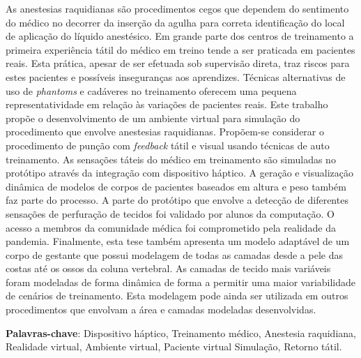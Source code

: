 \begin{resumo}


As anestesias raquidianas são procedimentos cegos que dependem do sentimento do médico no decorrer da inserção da agulha para correta identificação do local de aplicação do líquido anestésico. Em grande parte dos centros de treinamento a primeira experiência tátil do médico em treino tende a ser praticada em pacientes reais. Esta prática, apesar de ser efetuada sob supervisão direta, traz riscos para estes pacientes e possíveis inseguranças aos aprendizes. Técnicas alternativas de uso de \textit{phantoms} e cadáveres no treinamento oferecem uma pequena representatividade em relação às variações de pacientes reais. 
Este trabalho propõe o desenvolvimento de um ambiente virtual para simulação do procedimento que envolve anestesias raquidianas. Propõem-se considerar o procedimento de punção com \textit{feedback} tátil e visual usando técnicas de auto treinamento. As sensações táteis do médico em treinamento são simuladas no protótipo através da integração com dispositivo háptico. A geração e visualização dinâmica de modelos de corpos de pacientes baseados em altura e peso também faz parte do processo. A parte do protótipo que envolve a detecção de diferentes sensações de perfuração de tecidos foi validado por alunos da computação. O acesso a membros da comunidade médica foi comprometido pela realidade da pandemia. Finalmente, esta tese  também apresenta um modelo adaptável de um corpo de gestante que possui modelagem de todas as camadas desde a pele das costas até os ossos da coluna vertebral. As camadas de tecido mais variáveis foram modeladas de forma dinâmica de forma a permitir uma maior variabilidade de cenários de treinamento. Esta modelagem pode ainda ser utilizada em outros procedimentos que envolvam a área e camadas modeladas desenvolvidas.

{\hspace{-8mm} \bf{Palavras-chave}}: Dispositivo háptico, Treinamento médico, Anestesia raquidiana, Realidade virtual, Ambiente virtual, Paciente virtual Simulação, Retorno tátil.

\end{resumo}

